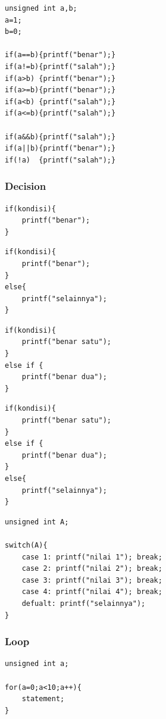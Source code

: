 \documentclass[12pt,]{article}
\begin{document}
	\begin{verbatim}
unsigned int a,b;
a=1;
b=0;

if(a==b){printf("benar");}
if(a!=b){printf("salah");}
if(a>b) {printf("benar");}
if(a>=b){printf("benar");}
if(a<b) {printf("salah");}
if(a<=b){printf("salah");}

if(a&&b){printf("salah");}
if(a||b){printf("benar");}
if(!a)  {printf("salah");}
	\end{verbatim}
	
	\subsubsection{Decision}
	\begin{verbatim}
if(kondisi){
	printf("benar");
}
	\end{verbatim}
	
	\begin{verbatim}
if(kondisi){
	printf("benar");
}
else{
	printf("selainnya");
}
	\end{verbatim}
	
	\begin{verbatim}
if(kondisi){
	printf("benar satu");
}
else if {
	printf("benar dua");
}
	\end{verbatim}
	
	\begin{verbatim}
if(kondisi){
	printf("benar satu");
}
else if {
	printf("benar dua");
}
else{
	printf("selainnya");
}
	\end{verbatim}
	
	\begin{verbatim}
unsigned int A;

switch(A){
	case 1: printf("nilai 1"); break;
	case 2: printf("nilai 2"); break;
	case 3: printf("nilai 3"); break;
	case 4: printf("nilai 4"); break;
	defualt: printf("selainnya");
}
	\end{verbatim}
	
	\subsubsection{Loop}
	
	\begin{verbatim}
unsigned int a;

for(a=0;a<10;a++){
	statement;
}
	\end{verbatim}
	
\end{document}
